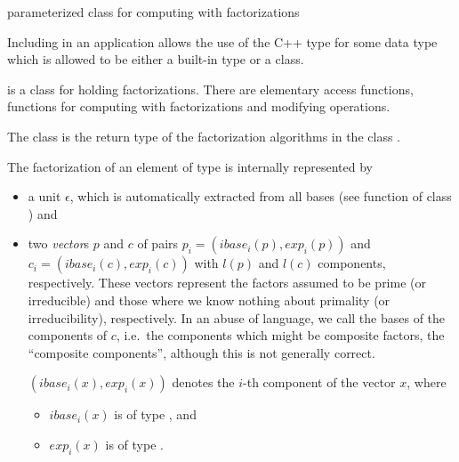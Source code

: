 
\newcommand{\ibase}{\mathit{ibase}}
\newcommand{\expt}{\mathit{exp}}



\NAME

 \dotfill parameterized class for computing with
factorizations



\ABSTRACT

Including  in an application allows the use of the C++ type
 for some data type  which is allowed to be either a built-in
type or a class.

 is a class for holding factorizations.  There are elementary access
functions, functions for computing with factorizations and modifying operations.

The class  is the return type of the factorization algorithms in the
class .



\DESCRIPTION

The factorization of an element of type  is internally represented by

\begin{itemize}
\item a unit $\epsilon$, which is automatically extracted from all bases (see function
   of class ) and
  
\item two \emph{vector}s $p$ and $c$ of pairs $p_i = (\ibase_i(p),\expt_i(p))$ and $c_i =
  (\ibase_i(c),\expt_i(c))$ with $l(p)$ and $l(c)$ components, respectively.  These vectors
  represent the factors assumed to be prime (or irreducible) and those where we know nothing
  about primality (or irreducibility), respectively.  In an abuse of language, we call the bases
  of the components of $c$, i.e.~the components which might be composite factors, the
  ``composite components'', although this is not generally correct.
  
  $(\ibase_i(x), \expt_i(x))$ denotes the $i$-th component of the vector $x$, where
  \begin{itemize}
  \item $\ibase_i(x)$ is of type , and
  \item $\expt_i(x)$ is of type .
  \end{itemize}
\end{itemize}

